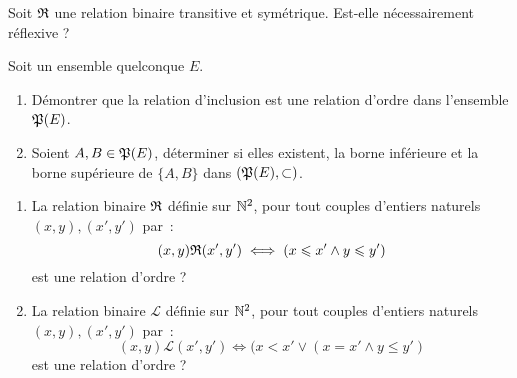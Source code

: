\begin{exercice}
    Soit \(\mathfrak{R}\) une relation binaire transitive et symétrique. Est-elle nécessairement réflexive ?
\end{exercice}
\begin{exercice}
    Soit un ensemble quelconque \(E\).
    \begin{enumerate}
        \item Démontrer que la relation d'inclusion est une relation d'ordre dans l'ensemble \(\mathfrak{P}(E)\).
        \item Soient \(A, B \in \mathfrak{P}(E)\), déterminer si elles existent, la borne inférieure et la borne supérieure de \(\{A, B\}\) dans \((\mathfrak{P}(E), \subset)\).
    \end{enumerate}
\end{exercice}
\begin{exercice}
    \begin{enumerate}
        \item La relation binaire \(\mathfrak{R}\) définie sur \(\mathbb{N}^2\), pour tout couples d'entiers naturels \((x,y), (x',y')\) par~: \[(x,y)\mathfrak{R}{}(x',y') \iff (x \leqslant x' \land y \leqslant y')\] est une relation d'ordre ?
        \item La relation binaire \(\mathcal{L}\) définie sur \(\mathbb{N}^2\), pour tout couples d'entiers naturels \((x,y), (x',y')\) par~: \[(x,y)\mathcal{L}(x',y') \iff (x < x' \lor (x=x' \land y \leqslant y')\] est une relation d'ordre ?
    \end{enumerate}
\end{exercice}
